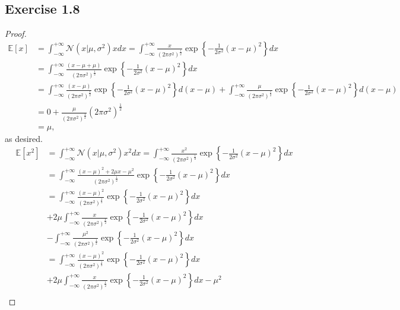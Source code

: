 \documentclass[11pt]{article}
\theoremstyle{definition}
\newcommand{\E}{\mathbb{E}}
\begin{document}
\subsection{Exercise 1.8}
\begin{proof}
\begin{align*}
\E[x] &= \int^{+\infty}_{-\infty}\mathcal{N}\left(x|\mu,\sigma^2\right)xdx = \int^{+\infty}_{-\infty}\frac{x}{(2\pi\sigma^2)^{\frac{1}{2}}}\exp\left\{-\frac{1}{2\sigma^2}\left(x-\mu\right)^2\right\}dx\\
&= \int^{+\infty}_{-\infty}\frac{(x-\mu+\mu)}{(2\pi\sigma^2)^{\frac{1}{2}}}\exp\left\{-\frac{1}{2\sigma^2}\left(x-\mu\right)^2\right\}dx\\
&= \int^{+\infty}_{-\infty}\frac{(x-\mu)}{(2\pi\sigma^2)^{\frac{1}{2}}}\exp\left\{-\frac{1}{2\sigma^2}\left(x-\mu\right)^2\right\}d(x-\mu) +  \int^{+\infty}_{-\infty}\frac{\mu}{(2\pi\sigma^2)^{\frac{1}{2}}}\exp\left\{-\frac{1}{2\sigma^2}\left(x-\mu\right)^2\right\}d(x-\mu)\\
&= 0 + \frac{\mu}{(2\pi\sigma^2)^{\frac{1}{2}}}(2\pi\sigma^2)^{\frac{1}{2}}\\
&= \mu,
\end{align*}
as desired.
\begin{equation*}
\begin{aligned}
\E[x^2] &= \int^{+\infty}_{-\infty}\mathcal{N}\left(x|\mu,\sigma^2\right)x^2dx = \int^{+\infty}_{-\infty}\frac{x^2}{(2\pi\sigma^2)^{\frac{1}{2}}}\exp\left\{-\frac{1}{2\sigma^2}\left(x-\mu\right)^2\right\}dx\\
&= \int^{+\infty}_{-\infty}\frac{(x-\mu)^2+2\mu x - \mu^2}{(2\pi\sigma^2)^{\frac{1}{2}}}\exp\left\{-\frac{1}{2\sigma^2}\left(x-\mu\right)^2\right\}dx\\
&= \int^{+\infty}_{-\infty}\frac{(x-\mu)^2}{(2\pi\sigma^2)^{\frac{1}{2}}}\exp\left\{-\frac{1}{2\sigma^2}\left(x-\mu\right)^2\right\}dx\\ &+ 2\mu \int^{+\infty}_{-\infty}\frac{x}{(2\pi\sigma^2)^{\frac{1}{2}}}\exp\left\{-\frac{1}{2\sigma^2}\left(x-\mu\right)^2\right\}dx\\ & - \int^{+\infty}_{-\infty}\frac{\mu^2}{(2\pi\sigma^2)^{\frac{1}{2}}}\exp\left\{-\frac{1}{2\sigma^2}\left(x-\mu\right)^2\right\}dx\\
&= \int^{+\infty}_{-\infty}\frac{(x-\mu)^2}{(2\pi\sigma^2)^{\frac{1}{2}}}\exp\left\{-\frac{1}{2\sigma^2}\left(x-\mu\right)^2\right\}dx\\ &+ 2\mu \int^{+\infty}_{-\infty}\frac{x}{(2\pi\sigma^2)^{\frac{1}{2}}}\exp\left\{-\frac{1}{2\sigma^2}\left(x-\mu\right)^2\right\}dx -\mu^2\\

\end{aligned}
\end{equation*}
\end{proof}
\end{document}
